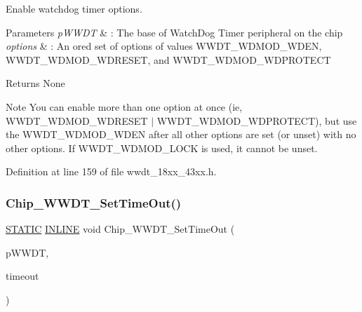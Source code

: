Enable watchdog timer options. 


\begin{DoxyParams}{Parameters}
{\em p\+W\+W\+DT} & \+: The base of Watch\+Dog Timer peripheral on the chip \\
\hline
{\em options} & \+: An or\textquotesingle{}ed set of options of values W\+W\+D\+T\+\_\+\+W\+D\+M\+O\+D\+\_\+\+W\+D\+EN, W\+W\+D\+T\+\_\+\+W\+D\+M\+O\+D\+\_\+\+W\+D\+R\+E\+S\+ET, and W\+W\+D\+T\+\_\+\+W\+D\+M\+O\+D\+\_\+\+W\+D\+P\+R\+O\+T\+E\+CT \\
\hline
\end{DoxyParams}
\begin{DoxyReturn}{Returns}
None 
\end{DoxyReturn}
\begin{DoxyNote}{Note}
You can enable more than one option at once (ie, W\+W\+D\+T\+\_\+\+W\+D\+M\+O\+D\+\_\+\+W\+D\+R\+E\+S\+ET $\vert$ W\+W\+D\+T\+\_\+\+W\+D\+M\+O\+D\+\_\+\+W\+D\+P\+R\+O\+T\+E\+CT), but use the W\+W\+D\+T\+\_\+\+W\+D\+M\+O\+D\+\_\+\+W\+D\+EN after all other options are set (or unset) with no other options. If W\+W\+D\+T\+\_\+\+W\+D\+M\+O\+D\+\_\+\+L\+O\+CK is used, it cannot be unset. 
\end{DoxyNote}


Definition at line 159 of file wwdt\+\_\+18xx\+\_\+43xx.\+h.

\mbox{\label{group___w_w_d_t__18_x_x__43_x_x_ga3147a15042f4276588c83e98b0a1b996}} 
\subsubsection{\texorpdfstring{Chip\+\_\+\+W\+W\+D\+T\+\_\+\+Set\+Time\+Out()}{Chip\_WWDT\_SetTimeOut()}}
{\footnotesize\ttfamily \hyperlink{group___l_p_c___types___public___macros_ga10b2d890d871e1489bb02b7e70d9bdfb}{S\+T\+A\+T\+IC} \hyperlink{spifi__18xx__43xx_8h_a2eb6f9e0395b47b8d5e3eeae4fe0c116}{I\+N\+L\+I\+NE} void Chip\+\_\+\+W\+W\+D\+T\+\_\+\+Set\+Time\+Out (\begin{DoxyParamCaption}\item[{\hyperlink{struct_l_p_c___w_w_d_t___t}{L\+P\+C\+\_\+\+W\+W\+D\+T\+\_\+T} $\ast$}]{p\+W\+W\+DT,  }\item[{uint32\+\_\+t}]{timeout }\end{DoxyParamCaption})}



